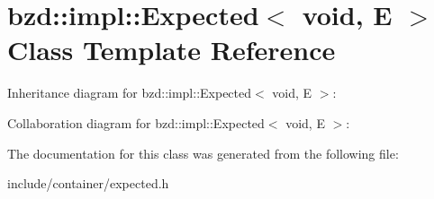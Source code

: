 \hypertarget{classbzd_1_1impl_1_1Expected_3_01void_00_01E_01_4}{}\section{bzd\+:\+:impl\+:\+:Expected$<$ void, E $>$ Class Template Reference}
\label{classbzd_1_1impl_1_1Expected_3_01void_00_01E_01_4}


Inheritance diagram for bzd\+:\+:impl\+:\+:Expected$<$ void, E $>$\+:


Collaboration diagram for bzd\+:\+:impl\+:\+:Expected$<$ void, E $>$\+:


The documentation for this class was generated from the following file\+:\begin{DoxyCompactItemize}
\item 
include/container/expected.\+h\end{DoxyCompactItemize}
